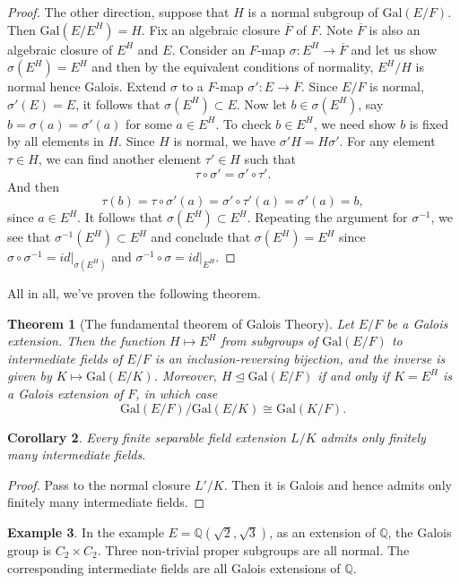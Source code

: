 \documentclass[12pt]{report}
\newtheorem{theorem}{Theorem}[section]
\newtheorem{corollary}[theorem]{Corollary}
\theoremstyle{definition}
\newtheorem{example}[theorem]{Example}
\newcommand{\Gal}{\text{Gal}}
\newcommand{\QQ}{\mathbb{Q}}
\begin{document}
\begin{proof}
	The other direction, suppose that $H$ is a normal subgroup of $\Gal(E/F)$. Then $\Gal(E/E^H) = H$. Fix an algebraic closure $\overline{F}$ of $F$. Note $\overline{F}$ is also an algebraic closure of $E^H$ and $E$. Consider an $F$-map $\sigma: E^H\to \overline{F}$ and let us show $\sigma(E^H)=E^H$ and then by the equivalent conditions of normality, $E^H/H$ is normal hence Galois. Extend $\sigma$ to a $F$-map $\sigma': E\to \overline{F}$. Since $E/F$ is normal, $\sigma'(E)=E$, it follows that $\sigma(E^H)\subset E$. Now let $b\in \sigma(E^H)$, say $b=\sigma(a)=\sigma'(a)$ for some $a\in E^H$. To check $b\in E^H$, we need show $b$ is fixed by all elements in $H$. Since $H$ is normal, we have $\sigma' H=H\sigma'$. For any element $\tau\in H$, we can find another element $\tau'\in H$ such that $$\tau \circ \sigma' =\sigma'\circ \tau'.$$
	And then $$\tau(b)=\tau\circ\sigma'(a)=\sigma'\circ \tau'(a)= \sigma'(a)=b,$$ since $a\in E^H$. It follows that $\sigma(E^H)\subset E^H$. Repeating the argument for $\sigma^{-1}$, we see that $\sigma^{-1}(E^H)\subset E^H$  and conclude that $\sigma(E^H)=E^H$ since $\sigma\circ\sigma^{-1} =id|_{\sigma(E^H)}$ and $\sigma^{-1}\circ \sigma=id|_{E^H}$.
\end{proof}

All in all, we've proven the following theorem.

\begin{theorem}[The fundamental theorem of Galois Theory]\label{galois}
	Let $E/F$ be a Galois extension. Then the function $H \mapsto E^H$ from subgroups of $\Gal(E/F)$ to intermediate fields of $E/F$ is an inclusion-reversing bijection, and the inverse is given by $K \mapsto \Gal(E/K)$. Moreover, $H \trianglelefteq \Gal(E/F)$ if and only if $K = E^H$ is a Galois extension of $F$, in which case $$\Gal(E/F)/\Gal(E/K) \cong \Gal(K/F).$$
\end{theorem}

\begin{corollary}
	Every finite separable field extension $L/K$ admits only finitely many intermediate fields.
\end{corollary}

\begin{proof}
	Pass to the normal closure $L'/K$. Then it is Galois and hence admits only finitely many intermediate fields.
\end{proof}

\begin{example}
	In the example $E=\QQ(\sqrt{2},\sqrt{3})$, as an extension of $\QQ$, the Galois group is $C_2\times C_2$. Three non-trivial proper subgroups are all normal. The corresponding intermediate fields are all Galois extensions of $\QQ$.
\end{example}
\end{document}
